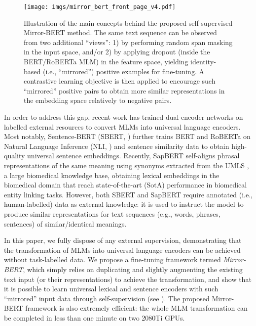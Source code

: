 \documentclass[11pt]{article}
\begin{document}
\begin{figure}[t!]
    \centering
    \texttt{[image: imgs/mirror\_bert\_front\_page\_v4.pdf]}
    \caption{Illustration of the main concepts behind the proposed self-supervised Mirror-BERT method. The same text sequence can be observed from two additional ``views'': 1) by performing random span masking in the input space, and/or 2) by applying dropout (inside the BERT/RoBERTa MLM) in the feature space, yielding identity-based (i.e., ``mirrored'') positive examples for fine-tuning. A contrastive learning objective is then applied to encourage such ``mirrored'' positive pairs to obtain more similar representations in the embedding space relatively to negative pairs.}
    \label{fig:sketch_of_concept}
\end{figure}

In order to address this gap, recent work has trained dual-encoder networks on labelled external resources to convert MLMs into universal language encoders. Most notably, Sentence-BERT (SBERT, \citealt{reimers2019sentence}) further trains BERT and RoBERTa on Natural Language Inference (NLI, \citealt{bowman-etal-2015-large,Williams:2018naacl}) and sentence similarity data \cite{cer2017semeval} to obtain high-quality universal sentence embeddings. Recently, SapBERT \citep{liu2020self} self-aligns phrasal representations of the same meaning using synonyms extracted from the UMLS \cite{bodenreider2004unified}, a large biomedical knowledge base, obtaining lexical embeddings in the biomedical domain that reach state-of-the-art (SotA) performance in biomedical entity linking tasks. However, both SBERT and SapBERT require annotated (i.e., human-labelled) data as external knowledge: it is used to instruct the model to produce similar representations for text sequences (e.g., words, phrases, sentences) of similar/identical meanings. 


In this paper, we fully dispose of any external supervision, demonstrating that the transformation of MLMs into universal language encoders can be achieved without task-labelled data. We propose a fine-tuning framework termed \textit{Mirror-BERT}, which simply relies on duplicating and slightly augmenting the existing text input (or their representations) to achieve the transformation, and show that it is possible to learn universal lexical and sentence encoders with such ``mirrored'' input data through self-supervision (see ). The proposed Mirror-BERT framework is also extremely efficient: the whole MLM transformation can be completed in less than one minute on two 2080Ti GPUs. 
\end{document}
